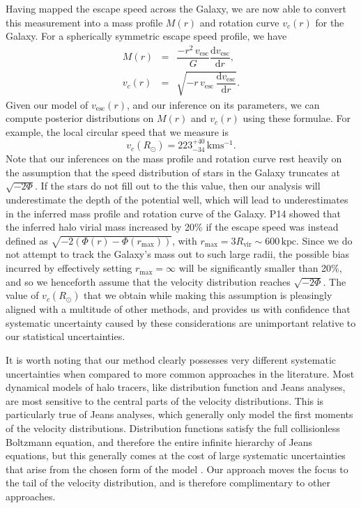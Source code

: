 \documentclass[useAMS,twocolumn,usenatbib]{mn2e}
\def\kpc{{\,\mathrm{kpc}}}
\def\kms{{\,\mathrm{kms^{-1}}}}
\def\vesc{{v_\mathrm{esc}}}
\begin{document}
Having mapped the escape speed across the Galaxy, we are now able to convert this measurement into a mass profile $M(r)$ and rotation curve $v_c(r)$ for the Galaxy. 
For a spherically symmetric escape speed profile, we have
%
\begin{eqnarray}
M(r) &=& \dfrac{-r^2\,\vesc}{G}\dfrac{\mathrm{d}\vesc}{\mathrm{d}r}, \label{eq:mass}\\
v_c(r) &=& \sqrt{-r\,\vesc\,\dfrac{\mathrm{d}\vesc}{\mathrm{d}r}}. \label{eq:circspeed}
\end{eqnarray}
%
Given our model of $\vesc(r)$, and our inference on its parameters, we can compute posterior distributions on $M(r)$ and $v_c(r)$ using these formulae.
For example, the local circular speed that we measure is
%
\begin{equation}
v_c(R_\odot) = 223^{+40}_{-34}\kms.
\end{equation}
%
Note that our inferences on the mass profile and rotation curve rest heavily on the assumption that the speed distribution of stars in the Galaxy truncates at $\sqrt{-2\Phi}$.
If the stars do not fill out to the this value, then our analysis will underestimate the depth of the potential well, which will lead to underestimates in the inferred mass profile and rotation curve of the Galaxy.
P14 showed that the inferred halo virial mass increased by 20\% if the escape speed was instead defined as $\sqrt{-2\left(\Phi(r) - \Phi(r_\mathrm{max})\right)}$, with $r_\mathrm{max} = 3R_\mathrm{vir} \sim 600\kpc$.
Since we do not attempt to track the Galaxy's mass out to such large radii, the possible bias incurred by effectively setting $r_\mathrm{max} = \infty$ will be significantly smaller than 20\%, and so we henceforth assume that the velocity distribution reaches $\sqrt{-2\Phi}$.
The value of $v_c(R_\odot)$ that we obtain while making this assumption is pleasingly aligned with a multitude of other methods, and provides us with confidence that systematic uncertainty caused by these considerations are unimportant relative to our statistical uncertainties.

It is worth noting that our method clearly possesses very different systematic uncertainties when compared to more common approaches in the literature.
Most dynamical models of halo tracers, like distribution function and Jeans analyses, are most sensitive to the central parts of the velocity distributions.
This is particularly true of Jeans analyses, which generally only model the first moments of the velocity distributions. 
Distribution functions satisfy the full collisionless Boltzmann equation, and therefore the entire infinite hierarchy of Jeans equations, but this generally comes at the cost of large systematic uncertainties that arise from the chosen form of the model \citep{Wa15}.  
Our approach moves the focus to the tail of the velocity distribution, and is therefore complimentary to other approaches.
\end{document}
